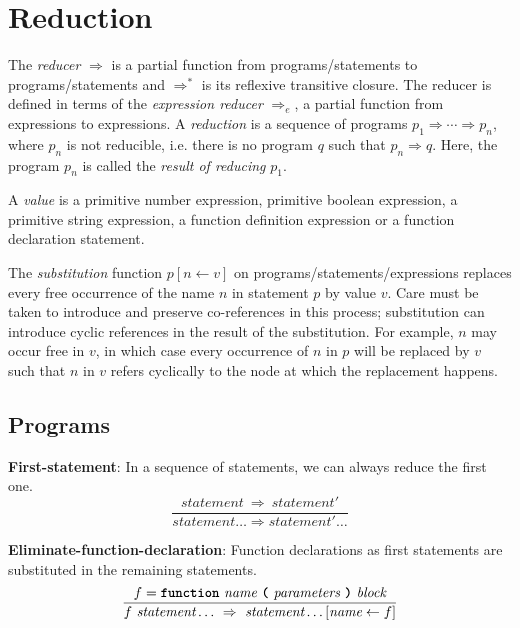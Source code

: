 \section*{Reduction}

The \emph{reducer} $\Rightarrow$ is a partial function from
programs/statements to
programs/statements 
and $\Rightarrow^*$ is its reflexive transitive closure.
The reducer is defined in terms of the
\emph{expression reducer} $\Rightarrow_e$, a partial function from
expressions to expressions.
A \emph{reduction} is a sequence of programs
$p_1 \Rightarrow \cdots \Rightarrow p_n$,
where $p_n$ is not reducible, i.e. there is no
program $q$ such that $p_n \Rightarrow q$.
Here, the program $p_n$ is called the \emph{result
of reducing} $p_1$.

A \emph{value} is a primitive number expression,
primitive boolean expression,
a primitive string expression, a function definition
expression or a function declaration statement.

The \emph{substitution} function 
$p [ n \leftarrow v ]$ on programs/statements/expressions
replaces every free occurrence of the name $n$
in statement $p$ by value $v$. Care must be taken to introduce
and preserve
co-references in this process; substitution can introduce
cyclic references in the result of the substitution. For example,
$n$ may occur free in $v$, in which case
every occurrence of $n$ in $p$
will be replaced by $v$ such that $n$ in $v$ refers cyclically
to the node at which the replacement happens.

\subsection*{Programs}


\textbf{First-statement}: In a sequence of statements, we can always
reduce the first one.
\[
\frac{
  \textit{statement}\ \Rightarrow\ \textit{statement}'
}{  
  \textit{statement} \ldots
  \Rightarrow 
  \textit{statement}' \ldots
}
\]

\vspace{10mm}

\textbf{Eliminate-function-declaration}: Function declarations as first
statements are substituted in the remaining statements.
\[
\frac{
             f = \textbf{\texttt{function}}\  \textit{name} \ 
                 \textbf{\texttt{(}}\  \textit{parameters}
                 \ \textbf{\texttt{)}}\ \textit{block}
}{
f\ \textit{statement} \ldots\ 
  \Rightarrow\ 
  \textit{statement} \ldots[\textit{name} \leftarrow f]
}
\]

